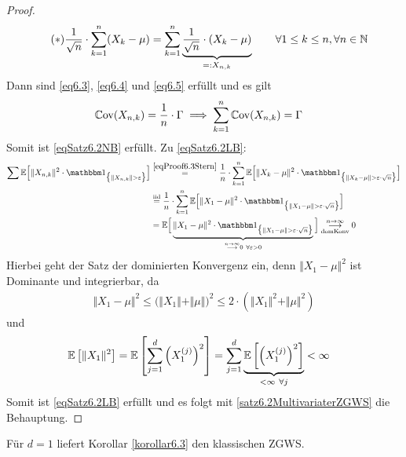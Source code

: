 \begin{proof}
	\begin{align}\label{eqProof6.3Stern}\tag{$\ast$}
		\frac{1}{\sqrt{n}}\cdot\sum\limits_{k=1}^n(X_k-\mu)
		&=\sum\limits_{k=1}^n\underbrace{\frac{1}{\sqrt{n}}\cdot(X_k-\mu)}_{=:X_{n,k}}\qquad\forall 1\leq k\leq n,\forall n\in\mathbb{N}
	\end{align}
	Dann sind \eqref{eq6.3}, \eqref{eq6.4} und \eqref{eq6.5} erfüllt und es gilt
	\begin{align*}
		\mathbb{C}\text{ov}(X_{n,k})
		&=\frac{1}{n}\cdot\Gamma\implies\sum\limits_{k=1}^n\mathbb{C}\text{ov}(X_{n,k})=\Gamma
	\end{align*}
	Somit ist \eqref{eqSatz6.2NB} erfüllt. Zu \eqref{eqSatz6.2LB}:
	\begin{align*}
		\sum\limits\E\Big[\Vert X_{n,k}\Vert^2\cdot\indi_{\big\lbrace\Vert X_{n,k}\Vert>\varepsilon\big\rbrace}\Big]
		&\stackeq{\eqref{eqProof6.3Stern}}
		\frac{1}{n}\cdot\sum\limits_{k=1}^n\E\Big[\Vert X_k-\mu\Vert^2\cdot\indi_{\big\lbrace\Vert X_k-\mu\Vert>\varepsilon\cdot\sqrt{n}\big\rbrace}\Big]\\
		&\stackeq{\text{iid}}
		\frac{1}{n}\cdot\sum\limits_{k=1}^n\E\Big[\Vert X_1-\mu\Vert^2\cdot\indi_{\big\lbrace\Vert X_1-\mu\Vert>\varepsilon\cdot\sqrt{n}\big\rbrace}\Big]\\
		&=\E\Big[\underbrace{\Vert X_1-\mu\Vert^2\cdot\indi_{\big\lbrace \Vert X_1-\mu\Vert>\varepsilon\cdot\sqrt{n}\big\rbrace}}_{\stackrel{n\to\infty}{\longrightarrow}0~\forall\varepsilon>0}\Big]
		\stackrelnew{\text{domKonv}}{n\to\infty}{\longrightarrow}0
	\end{align*}
	Hierbei geht der Satz der dominierten Konvergenz ein, denn $\Vert X_1-\mu\Vert^2$ ist Dominante und integrierbar, da 
	\begin{align*}
		\Vert X_1-\mu\Vert^2\leq\big(\Vert X_1\Vert+\Vert\mu\Vert\big)^2\leq 2\cdot\left(\Vert X_1\Vert^2+\Vert\mu\Vert^2\right)
	\end{align*}
	und 
	\begin{align*}
		\mathbb{E}\left[\Vert X_1\Vert^2\right]
		&=\mathbb{E}\left[\sum\limits_{j=1}^d\left(X_1^{(j)}\right)^2\right]
		=\sum\limits_{j=1}^d\underbrace{\mathbb{E}\left[\left(X_1^{(j)}\right)^2\right]}_{<\infty~\forall j}<\infty
	\end{align*}
	Somit ist \eqref{eqSatz6.2LB} erfüllt und es folgt mit \ref{satz6.2MultivariaterZGWS} die Behauptung.
\end{proof}

Für $d=1$ liefert Korollar \ref{korollar6.3} den klassischen ZGWS.

